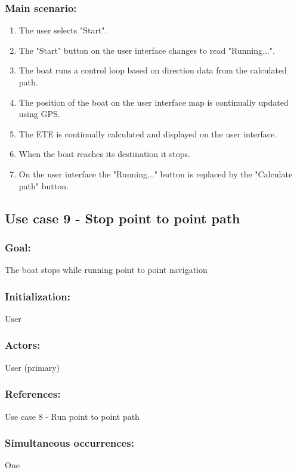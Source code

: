 \subsubsection*{Main scenario:}
\begin{enumerate}
	\item The user selects "Start".
	\item The "Start" button on the user interface changes to read "Running...".
	\item The boat runs a control loop based on direction data from the calculated path.
	\item The position of the boat on the user interface map is continually updated using GPS.
	\item The ETE is continually calculated and displayed on the user interface.
	\item When the boat reaches its destination it stops.
	\item On the user interface the "Running..." button is replaced by the "Calculate path" button.
\end{enumerate}	


\subsection{Use case 9 - Stop point to point path}
\subsubsection*{Goal:}
The boat stops while running point to point navigation

\subsubsection*{Initialization:}
User

\subsubsection*{Actors:}
User (primary)

\subsubsection*{References:}
Use case 8 - Run point to point path

\subsubsection*{Simultaneous occurrences:}
One 

